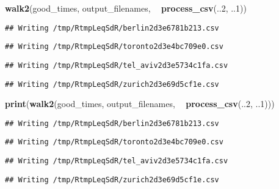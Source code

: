 \documentclass[]{book}
\newenvironment{Shaded}{\begin{snugshade}}{\end{snugshade}}
\newcommand{\DecValTok}[1]{\textcolor[rgb]{0.00,0.00,0.81}{#1}}
\newcommand{\KeywordTok}[1]{\textcolor[rgb]{0.13,0.29,0.53}{\textbf{#1}}}
\newcommand{\NormalTok}[1]{#1}
\newcommand{\OperatorTok}[1]{\textcolor[rgb]{0.81,0.36,0.00}{\textbf{#1}}}
\newcommand{\StringTok}[1]{\textcolor[rgb]{0.31,0.60,0.02}{#1}}
\begin{document}
\begin{Shaded}
\begin{Highlighting}[]
\KeywordTok{walk2}\NormalTok{(good_times, output_filenames, }\OperatorTok{~}\StringTok{ }\KeywordTok{process_csv}\NormalTok{(..}\DecValTok{2}\NormalTok{, ..}\DecValTok{1}\NormalTok{))}
\end{Highlighting}
\end{Shaded}

\begin{verbatim}
## Writing /tmp/RtmpLeqSdR/berlin2d3e6781b213.csv
\end{verbatim}

\begin{verbatim}
## Writing /tmp/RtmpLeqSdR/toronto2d3e4bc709e0.csv
\end{verbatim}

\begin{verbatim}
## Writing /tmp/RtmpLeqSdR/tel_aviv2d3e5734c1fa.csv
\end{verbatim}

\begin{verbatim}
## Writing /tmp/RtmpLeqSdR/zurich2d3e69d5cf1e.csv
\end{verbatim}

\begin{Shaded}
\begin{Highlighting}[]
\KeywordTok{print}\NormalTok{(}\KeywordTok{walk2}\NormalTok{(good_times, output_filenames, }\OperatorTok{~}\StringTok{ }\KeywordTok{process_csv}\NormalTok{(..}\DecValTok{2}\NormalTok{, ..}\DecValTok{1}\NormalTok{)))}
\end{Highlighting}
\end{Shaded}

\begin{verbatim}
## Writing /tmp/RtmpLeqSdR/berlin2d3e6781b213.csv
\end{verbatim}

\begin{verbatim}
## Writing /tmp/RtmpLeqSdR/toronto2d3e4bc709e0.csv
\end{verbatim}

\begin{verbatim}
## Writing /tmp/RtmpLeqSdR/tel_aviv2d3e5734c1fa.csv
\end{verbatim}

\begin{verbatim}
## Writing /tmp/RtmpLeqSdR/zurich2d3e69d5cf1e.csv
\end{verbatim}
\end{document}
